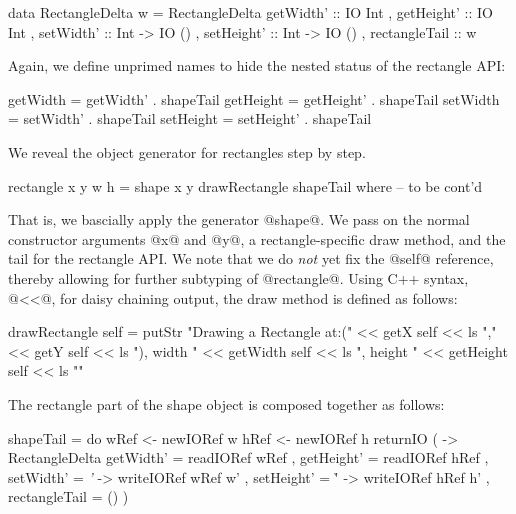 \documentclass{jfp}
\newcommand{\w}[1]{\textit{#1}}
\begin{document}
\begin{code}
 data RectangleDelta w =
      RectangleDelta { getWidth'     :: IO Int 
                     , getHeight'    :: IO Int
                     , setWidth'     :: Int -> IO ()
                     , setHeight'    :: Int -> IO ()
                     , rectangleTail :: w
                     }
\end{code}

Again, we define unprimed names to hide the nested status of the
rectangle API:

\begin{code}
 getWidth  = getWidth'  . shapeTail
 getHeight = getHeight' . shapeTail
 setWidth  = setWidth'  . shapeTail
 setHeight = setHeight' . shapeTail
\end{code}

We reveal the object generator for rectangles step by step.

\begin{code}
 rectangle x y w h
   = shape x y drawRectangle shapeTail
  where
    -- to be cont'd
\end{code}


That is, we bascially apply the generator @shape@.  We pass on the
normal constructor arguments @x@ and @y@, a rectangle-specific draw
method, and the tail for the rectangle API. We note that we do
\emph{not} yet fix the @self@ reference, thereby allowing for further
subtyping of @rectangle@. Using C++ syntax, @<<@, for daisy chaining
output, the draw method is defined as follows:

\begin{code}
   drawRectangle self
     =  
        putStr "Drawing a Rectangle at:(" <<
        getX self << ls "," << getY self <<
        ls "), width " << getWidth self <<
        ls ", height " << getHeight self <<
        ls "\n"
\end{code}

The rectangle part of the shape object is composed together as follows:

\begin{code}
   shapeTail
     = do 
          wRef <- newIORef w
          hRef <- newIORef h
          returnIO ( \self -> 
             RectangleDelta
                 { getWidth'     = readIORef wRef 
                 , getHeight'    = readIORef hRef
                 , setWidth'     = \w' -> writeIORef wRef w'
                 , setHeight'    = \h' -> writeIORef hRef h'
                 , rectangleTail = ()
                 } )
\end{code}
\end{document}

